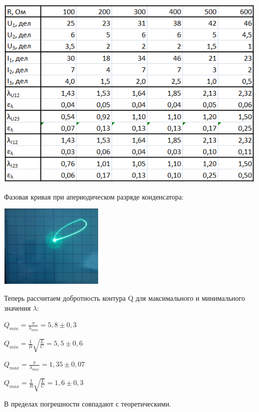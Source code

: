 \documentclass[12pt]{article}
\begin{document}
    \includegraphics[width=15cm]{table2.png}
    
    Фазовая кривая при апериодическом разряде конденсатора:
    
    \includegraphics[width=5cm]{img.png}
    
    Теперь рассчитаем добротность контура Q для максимального и минимального значения $\lambda$:
    
    $Q_{min} = \frac{\pi}{\lambda_{min}} = 5,8 \pm 0,3$
    
    $Q_{min} = \frac{1}{R}\sqrt{\frac{L}{C}} = 5,5 \pm 0,6$
    
    $Q_{max} = \frac{\pi}{\lambda_{max}} = 1,35 \pm 0,07$
    
    $Q_{max} = \frac{1}{R}\sqrt{\frac{L}{C}} = 1,6 \pm 0,3$
    
    В пределах погрешности совпадают с теоретическими.
\end{document}
